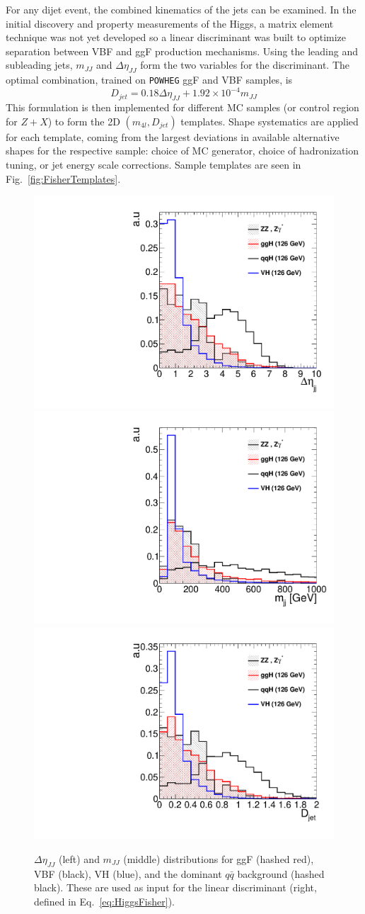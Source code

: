 For any dijet event, the combined kinematics of the jets can be examined. In the initial discovery and property measurements of the Higgs, a matrix element technique was not yet developed so a linear discriminant was built to optimize separation between VBF and ggF production mechanisms. Using the leading and subleading jets, $m_{JJ}$ and $\Delta\eta_{JJ}$ form the two variables for the discriminant. The optimal combination, trained on {\tt POWHEG} ggF and VBF samples, is
\begin{equation} \label{eq:HiggsFisher}
D_{jet} = 0.18\Delta\eta_{JJ} + 1.92\times10^{-4}m_{JJ}
\end{equation}
This formulation is then implemented for different MC samples (or control region for $Z+X$) to form the 2D $(m_{4l},D_{jet})$ templates. Shape systematics are applied for each template, coming from the largest deviations in available alternative shapes for the respective sample: choice of MC generator, choice of hadronization tuning, or jet energy scale corrections. Sample templates are seen in Fig.~\ref{fig:FisherTemplates}.

\begin{figure}[htbp]
\begin{center}
\includegraphics[width=.3\linewidth]{HiggsDiscovery/figures/deta_shape.pdf}
\includegraphics[width=.3\linewidth]{HiggsDiscovery/figures/mjj_shape.pdf}
\includegraphics[width=.3\linewidth]{HiggsDiscovery/figures/djet_shape.pdf} \\
\caption[Jet Kinematic Shapes of Different Higgs Production Mechanisms]{$\Delta\eta_{JJ}$ (left) and $m_{JJ}$ (middle) distributions for ggF (hashed red), VBF (black), VH (blue), and the dominant $q\bar{q}$ background (hashed black). These are used as input for the linear discriminant (right, defined in Eq.~\ref{eq:HiggsFisher}).}
\label{fig:HiggsFisher}
\end{center}
\end{figure}

